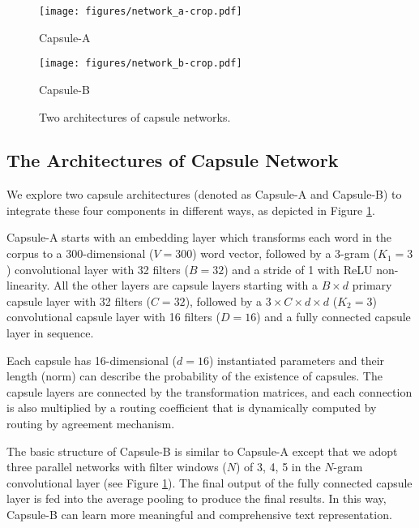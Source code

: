 \documentclass[11pt]{article}
\begin{document}
\begin{figure}
\begin{minipage}{0.3\linewidth}  
	\centerline{\texttt{[image: figures/network\_a-crop.pdf]}}  
	\centerline{Capsule-A}  
\end{minipage} 
\begin{minipage}{0.68\linewidth}  
	\centerline{\texttt{[image: figures/network\_b-crop.pdf]}}  
	\centerline{Capsule-B}  
\end{minipage}  
\caption{Two architectures of capsule networks.}  
\label{fig:schema}
\vspace{-0.5cm}
\end{figure} 



\subsection{The Architectures of Capsule Network}
We explore two capsule architectures (denoted as Capsule-A and Capsule-B) to integrate these four components in different ways, as depicted in Figure \ref{fig:schema}. 

Capsule-A starts with an embedding layer which transforms each word in the corpus to a 300-dimensional ($V=300$) word vector, followed by a 3-gram ($K_{1}=3$) convolutional layer with 32 filters ($B=32$) and  a stride of 1 with ReLU non-linearity.  All the other layers are capsule layers starting with a $B\times d$ primary capsule layer with 32 filters ($C=32$), followed by a $3\times C\times d \times d$ ($K_{2}=3$) convolutional capsule layer with 16 filters ($D=16$) and a fully connected capsule layer in sequence. 

Each capsule has 16-dimensional ($d=16$) instantiated parameters and their length (norm) can describe the probability of the existence of capsules. 
The capsule layers are connected by the transformation matrices, and each connection is also multiplied by a routing coefficient that is dynamically computed by routing by agreement mechanism. 




The basic structure of Capsule-B is similar to Capsule-A except that we adopt three parallel networks with filter
windows ($N$) of 3, 4, 5 in the $N$-gram convolutional layer (see Figure \ref{fig:schema}). The final output of the fully connected capsule layer is fed into the average pooling to produce the final results. In this way, Capsule-B can learn more meaningful and comprehensive text representation. 
\end{document}
